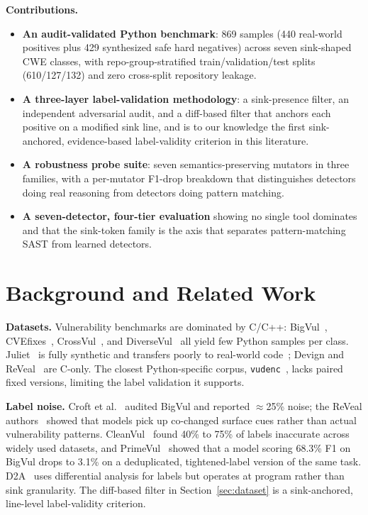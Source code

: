 \documentclass[conference]{IEEEtran}
\begin{document}
\noindent\textbf{Contributions.}
\begin{itemize}
  \item \textbf{An audit-validated Python benchmark}: 869 samples
    (440 real-world positives plus 429 synthesized safe hard negatives)
    across seven sink-shaped CWE classes, with repo-group-stratified
    train/validation/test splits (610/127/132) and zero cross-split
    repository leakage.
  \item \textbf{A three-layer label-validation methodology}: a
    sink-presence filter, an independent adversarial audit, and a
    diff-based filter that anchors each positive on a modified sink
    line, and is to our knowledge the first sink-anchored, evidence-based
    label-validity criterion in this literature.
  \item \textbf{A robustness probe suite}: seven semantics-preserving
    mutators in three families, with a per-mutator F1-drop breakdown
    that distinguishes detectors doing real reasoning from detectors
    doing pattern matching.
  \item \textbf{A seven-detector, four-tier evaluation} showing no
    single tool dominates and that the sink-token family is the axis
    that separates pattern-matching SAST from learned detectors.
\end{itemize}

\section{Background and Related Work}

\textbf{Datasets.} Vulnerability benchmarks are dominated by C/C++:
BigVul~\cite{bigvul}, CVEfixes~\cite{cvefixes},
CrossVul~\cite{crossvul}, and DiverseVul~\cite{diversevul}
all yield few Python samples per class. Juliet~\cite{juliet} is
fully synthetic and transfers poorly to real-world code~\cite{reveal};
Devign and ReVeal~\cite{devign,reveal} are C-only. The closest
Python-specific corpus, \texttt{vudenc}~\cite{vudenc}, lacks paired fixed
versions, limiting the label validation it supports.

\textbf{Label noise.} Croft et al.~\cite{croft} audited BigVul and
reported $\approx$25\% noise; the ReVeal authors~\cite{reveal} showed
that models pick up co-changed surface cues rather than actual vulnerability
patterns. CleanVul~\cite{cleanvul} found 40\% to 75\% of labels
inaccurate across widely used datasets, and PrimeVul~\cite{primevul}
showed that a model scoring 68.3\% F1 on BigVul drops to 3.1\% on a
deduplicated, tightened-label version of the same task. D2A~\cite{d2a}
uses differential analysis for labels but operates at program rather than
sink granularity. The diff-based filter in Section~\ref{sec:dataset} is a
sink-anchored, line-level label-validity criterion.
\end{document}
